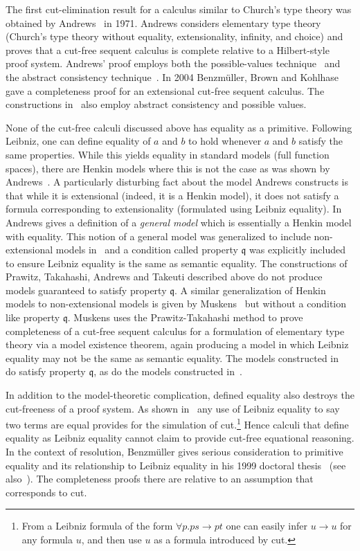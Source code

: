 The first cut-elimination result for a calculus similar
to Church's type theory was obtained by
Andrews~\cite{Andrews71} in 1971.  Andrews considers
elementary type theory (Church's type theory without
equality, extensionality, infinity, and choice) and
proves that a cut-free sequent calculus is complete
relative to a Hilbert-style proof system.  
Andrews' proof employs both the possible-values
technique~\cite{Takahashi67,Prawitz68} and the abstract
consistency technique~\cite{SmullyanBook}.
In 2004 Benzm\"uller, Brown and Kohlhase~\cite{BBKweb04} gave
a completeness proof for an extensional cut-free sequent calculus.
The constructions in~\cite{BBKweb04} also employ abstract consistency
and possible values.

None of the cut-free calculi discussed above has
equality as a primitive.  Following Leibniz, one can
define equality of $a$ and $b$ to hold whenever $a$ and
$b$ satisfy the same properties.  While this yields
equality in standard models (full function spaces),
there are Henkin models where this is not the
case as was shown by Andrews~\cite{Andrews72a}.  
A particularly disturbing fact about the model Andrews constructs
is that while it is extensional (indeed, it is a Henkin model),
it does not satisfy a formula corresponding to extensionality
(formulated using Leibniz equality).
In~\cite{Andrews72a} Andrews gives
a definition of a {\em general model} which is essentially a Henkin model
with equality.
This notion of a general model was generalized to include non-extensional models in~\cite{BBK04}
and a condition called property $\mathfrak{q}$
was explicitly included to ensure Leibniz equality is the same as semantic equality.
The constructions of Prawitz, Takahashi, Andrews and Takeuti described above
do not produce models guaranteed to satisfy property $\mathfrak{q}$.
A similar generalization of Henkin models to non-extensional models is given by Muskens~\cite{Muskens07}
but without a condition like property $\mathfrak{q}$.  Muskens uses the Prawitz-Takahashi method
to prove completeness of a cut-free sequent calculus for a formulation of elementary type theory
via a model existence theorem, again producing a model in which Leibniz equality may not be the same as semantic equality.
The models constructed in~\cite{BBK04} do satisfy property $\mathfrak{q}$,
as do the models constructed in~\cite{BBKweb04}.

In addition
to the model-theoretic complication, defined equality also destroys the cut-freeness of a proof system.  As shown
in~\cite{BBK2009} any use of Leibniz equality to say
two terms are equal provides for the simulation of 
cut.\footnote{From a Leibniz formula of the form $\forall p.p s\to p t$ one can easily infer $u\to u$ for any formula $u$, and then use $u$ as a formula introduced by cut.} Hence calculi that define equality as Leibniz equality
cannot claim to provide cut-free equational reasoning.
In the context of resolution,
Benzm\"uller gives serious consideration to primitive equality
and its relationship to Leibniz equality in his 1999 doctoral thesis~\cite{Benzmuller99a} (see also~\cite{Benzmuller99b}).
The completeness proofs there are relative to an assumption that corresponds to cut.


